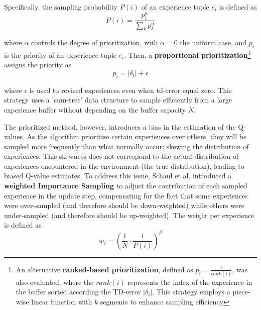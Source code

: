 Specifically, the sampling probability $P(i)$ of an experience tuple $e_i$ is defined as
\begin{equation}
    P(i) = \frac{p_i^\alpha}{\sum_k p_k^\alpha}
\end{equation}

where $\alpha$ controls the degree of prioritization, with $\alpha = 0$ the uniform case, and $p_i$ is the priority of an experience tuple $e_i$. Then, a \textbf{proportional prioritization}\footnote{An alternative \textbf{ranked-based prioritization}, defined as $p_i = \frac{1}{rank(i)}$, was also evaluated, where the $rank(i)$ represents the index of the experience in the buffer sorted according the TD-error $| \delta_i |$. This strategy employs a piece-wise linear function with $k$ segments to enhance sampling efficiency} assigns the priority as 
\begin{equation}
    p_i = | \delta_i | + \epsilon
\end{equation}

where $\epsilon$ is used to revised experiences even when td-error equal zero. This strategy uses a 'sum-tree' data structure to sample efficiently from a large experience buffer without depending on the buffer capacity $N$.


The prioritized method, however, introduces a bias in the estimation of the Q-values. As the algorithm prioritize certain experiences over others, they will be sampled more frequently than what normally occur; skewing the distribution of experiences. This skewness does not correspond to the actual distribution of experiences encountered in the environment (the true distribution), leading to biased Q-value estimates. To address this issue, Schaul et al. \cite{schaul2015prioritized} introduced a \textbf{weighted Importance Sampling} \cite{mahmood2014weighted} to adjust the contribution of each sampled experience in the update step, compensating for the fact that some experiences were over-sampled (and therefore should be down-weighted) while others were under-sampled (and therefore should be up-weighted). The weight per experience is defined as
\begin{equation}
    w_i = \left(\frac{1}{N} \cdot \frac{1}{P(i)} \right)^\beta
\end{equation}

